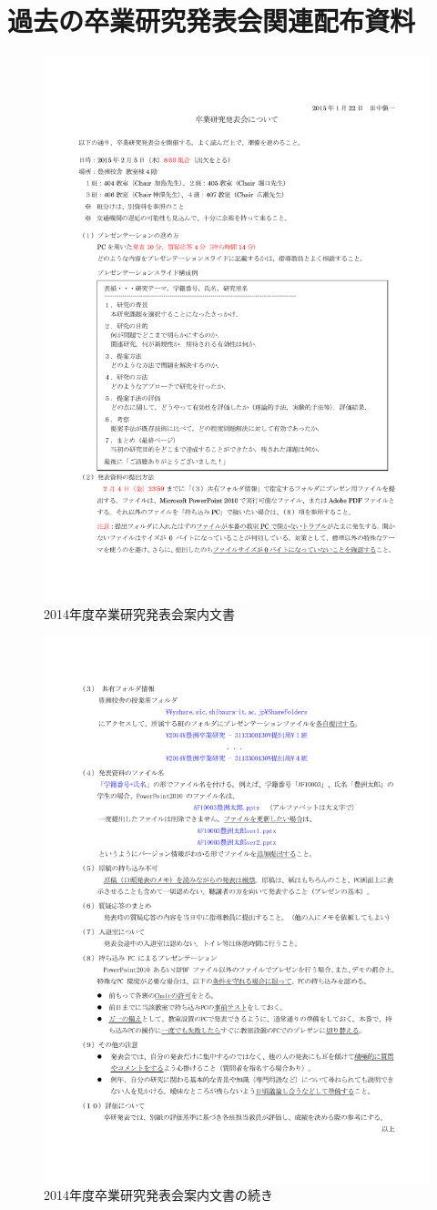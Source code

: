 \documentclass[a4j,12pt,dvipdfmx,oneside]{jsbook}
\theoremstyle{definition}
\begin{document}
\chapter{過去の卒業研究発表会関連配布資料}\label{chap:last}
%
%
%
\noindent
\begin{figure}[htbp]
\includegraphics[width=0.65\linewidth]{presenAnnounce1.pdf}
\caption{2014年度卒業研究発表会案内文書}
\label{fig:presenAnnounce1}
\end{figure}
\begin{figure}[htbp]
\includegraphics[width=0.8\linewidth]{presenAnnounce2.pdf}
\caption{2014年度卒業研究発表会案内文書の続き}
\label{fig:presenAnnounce2}
\end{figure}
\end{document}
